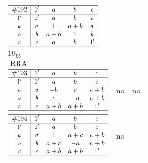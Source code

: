 \documentclass[12pt]{article}
\newcommand\RRA{\operatorname{RRA}}
\newcommand{\join}{\mathbin{+}}%
\newcommand{\id}{{1'}}%
\renewcommand{\top}{1}%
\begin{document}
\begin{center}
\begin{longtable}{l|c|c}
$
\begin{array}{|c|cccc|} \hline
\#192 & \id & a & b & c \\ \hline
\id & \id & a & b & c \\
a & a & \top & a \join b & a \\
b & b & a \join b & \top & b \\
c & c & a & b & \id \\ \hline
\end{array}
$
 & \begin{tabular}{c} yes \\ $19_{65}$ \\ $\RRA$ \end{tabular} 
 & \adjustbox{valign=c, max height=1.6cm}{$
\left[ \begin{array}{cccccc}
\id & a & a & b & c & b \\ 
a & \id & a & a & a & b \\ 
a & a & \id & b & a & b \\ 
b & a & b & \id & b & b \\ 
c & a & a & b & \id & b \\ 
b & b & b & b & b & \id
\end{array}\right]
$}      \\[15mm]

$
\begin{array}{|c|cccc|} \hline
\#193 & \id & a & b & c \\ \hline
\id & \id & a & b & c \\
a & a & -b & c & a \join b \\
b & b & c & -a & a \join b \\
c & c & a \join b & a \join b & \id \\ \hline
\end{array}
$
 & no  
 & no      \\[15mm]

$
\begin{array}{|c|cccc|} \hline
\#194 & \id & a & b & c \\ \hline
\id & \id & a & b & c \\
a & a & \top & a \join c & a \join b \\
b & b & a \join c & -a & a \join b \\
c & c & a \join b & a \join b & \id \\ \hline
\end{array}
$
 & no  
 & \adjustbox{valign=c, max height=1.6cm}{$
\left[ \begin{array}{cccccc}
\id & a & a & b & c & b \\ 
a & \id & a & a & a & c \\ 
a & a & \id & c & a & a \\ 
b & a & c & \id & b & b \\ 
c & a & a & b & \id & b \\ 
b & c & a & b & b & \id
\end{array}\right]
$}      \\[15mm]


\end{longtable}
\end{center}
\end{document}
